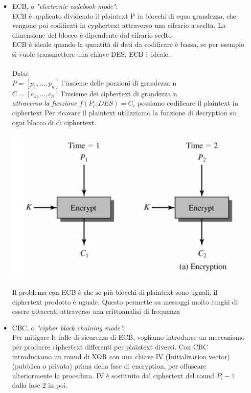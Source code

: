 \documentclass[11pt, oneside]{article}   	%
\begin{document}
\begin{itemize}
\item ECB, o \emph{"electronic codebook mode"}:\\
ECB è applicato dividendo il plaintext P in blocchi di equa grandezza, che vengono poi codificati in cyphertext attraverso una cifrario a scelta. La dimensione del blocco è dipendente dal cifrario scelto\\
ECB è ideale quando la quantità di dati da codificare è bassa, se per esempio si vuole traasmettere una chiave DES, ECB è ideale.\\\\
Dato: \\$P = [p_1, ..., p_n]$ l'insieme delle porzioni di grandezza n\\
$C = [c_1, ..., c_n]$ l'insieme dei ciphertext di grandezza n\\
\emph{attraverso la funzione} $f(P_i; DES) = C_i$ possiamo codificare il plaintext in ciphertext 
Per ricavare il plaintext utilizziamo la funzione di decryption su ogni blocco di di ciphertext.
\begin{center}
\includegraphics[scale= 0.7]{ecb}\\
\end{center}
Il problema con ECB è che se più blocchi di plaintext sono uguali, il ciphertext prodotto è uguale. Questo permette su messaggi molto lunghi di essere attaccati attraverso una crittoanalisi di frequenza
\item CBC, o \emph{"cipher block chaining mode"}:\\
Per mitigare le falle di sicurezza di ECB, vogliamo introdurre un meccanismo per produrre ciphertext differenti per plaintext diversi. Con CBC introduciamo un round di XOR con una chiave IV (Initialization vector)(pubblica o privata) prima della fase di encryption, per offuscare ulteriormente la procedura. IV è sostituito dal ciphertext del round $P_i-1$ dalla fase 2 in poi.

\end{itemize}
\end{document}
